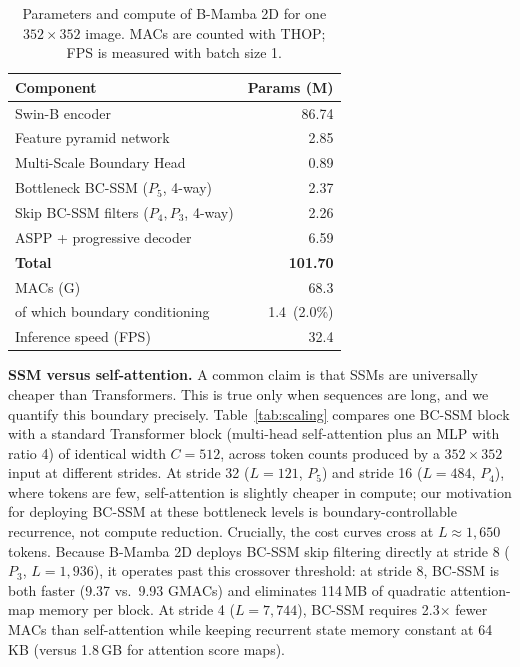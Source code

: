 \documentclass[journal]{IEEEtran}
\begin{document}
\begin{table}[t]
\centering
\caption{Parameters and compute of B-Mamba 2D for one $352\times352$ image. MACs are counted with THOP; FPS is measured with batch size 1.}
\label{tab:cost}
\setlength{\tabcolsep}{5pt}
\begin{tabular}{l r}
\toprule
Component & Params (M) \\
\midrule
Swin-B encoder                          & 86.74 \\
Feature pyramid network                 & 2.85 \\
Multi-Scale Boundary Head               & 0.89 \\
Bottleneck BC-SSM ($P_5$, 4-way)        & 2.37 \\
Skip BC-SSM filters ($P_4, P_3$, 4-way) & 2.26 \\
ASPP + progressive decoder              & 6.59 \\
\midrule
\textbf{Total}                          & \textbf{101.70} \\
\midrule
MACs (G)                                & 68.3 \\
\quad of which boundary conditioning    & 1.4\ (2.0\%) \\
Inference speed (FPS)                   & 32.4 \\
\bottomrule
\end{tabular}
\end{table}

\textbf{SSM versus self-attention.} A common claim is that SSMs are universally cheaper than Transformers. This is true only when sequences are long, and we quantify this boundary precisely. Table~\ref{tab:scaling} compares one BC-SSM block with a standard Transformer block (multi-head self-attention plus an MLP with ratio 4) of identical width $C=512$, across token counts produced by a $352\times352$ input at different strides. At stride 32 ($L=121$, $P_5$) and stride 16 ($L=484$, $P_4$), where tokens are few, self-attention is slightly cheaper in compute; our motivation for deploying BC-SSM at these bottleneck levels is boundary-controllable recurrence, not compute reduction. Crucially, the cost curves cross at $L\approx1{,}650$ tokens. Because B-Mamba 2D deploys BC-SSM skip filtering directly at stride 8 ($P_3$, $L=1{,}936$), it operates past this crossover threshold: at stride 8, BC-SSM is both faster (9.37 vs.\ 9.93 GMACs) and eliminates 114\,MB of quadratic attention-map memory per block. At stride 4 ($L=7{,}744$), BC-SSM requires 2.3$\times$ fewer MACs than self-attention while keeping recurrent state memory constant at 64\,KB (versus 1.8\,GB for attention score maps).
\end{document}
